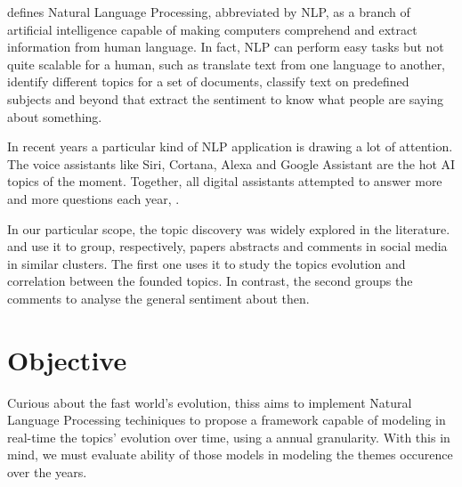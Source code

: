  defines Natural Language Processing, abbreviated by NLP, as a branch of artificial intelligence capable of making computers comprehend and extract information from human language.
In fact, NLP can perform easy tasks but not quite scalable for a human, such as translate text from one language to another, identify different topics for a set of documents, classify text on predefined subjects and beyond that extract the sentiment to know what people are saying about something.

In recent years a particular kind of NLP application is drawing a lot of attention. The voice assistants like Siri, Cortana, Alexa and Google Assistant are the hot AI topics of the moment. Together, all digital assistants attempted to answer more and more questions each year, \cite{kailakrayewski2019}.

\newpage
In our particular scope, the topic discovery was widely explored in the literature.  and  use it to group, respectively, papers abstracts and comments in social media in similar clusters. The first one uses it to study the topics evolution and correlation between the founded topics. In contrast, the second groups the comments to analyse the general sentiment about then.


\section{Objective}


Curious about the fast world's evolution, thiss aims to implement Natural Language Processing techiniques to propose a framework capable of modeling in real-time the topics' evolution over time, using a annual granularity. With this in mind, we must evaluate ability of those models in modeling the themes occurence over the years.


